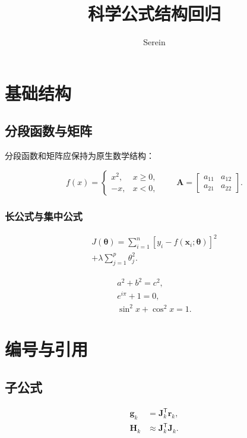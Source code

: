 \documentclass[UTF8]{ctexrep}
\title{科学公式结构回归}
\author{Serein}
\date{}
\begin{document}
\maketitle

\chapter{基础结构}

\section{分段函数与矩阵}

\noindent 分段函数和矩阵应保持为原生数学结构：

\[
f(x)
=
\begin{cases}
x^2, & x\geq 0,\\
-x, & x<0,
\end{cases}
\qquad
\bm A
=
\begin{bmatrix}
a_{11} & a_{12}\\
a_{21} & a_{22}
\end{bmatrix}.
\]

\subsection{长公式与集中公式}

\begin{multline}
J(\bm\theta)
=
\sum_{i=1}^{n}
\left[y_i-f(\bm x_i;\bm\theta)\right]^2\\
+\lambda\sum_{j=1}^{p}\theta_j^2.
\label{eq:structures-multline}
\end{multline}

\begin{gather*}
a^2+b^2=c^2,\\
e^{i\pi}+1=0,\\
\sin^2x+\cos^2x=1.
\end{gather*}

\chapter{编号与引用}

\section{子公式}

\begin{subequations}
\label{eq:structures-system}
\begin{align}
\bm g_k&=\bm J_k^{\mathsf T}\bm r_k,
\label{eq:structures-gradient}\\
\bm H_k&\approx\bm J_k^{\mathsf T}\bm J_k.
\label{eq:structures-hessian}
\end{align}
\end{subequations}
\end{document}
